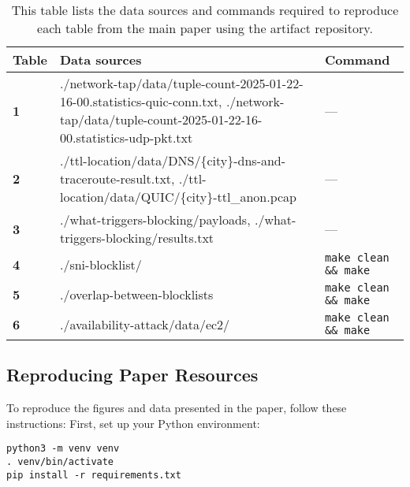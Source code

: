 \begin{table*}[h!]
    \centering
    \small
    \begin{tabularx}{\linewidth}{|l|X|X|} 
    \hline
    \textbf{Table} & \textbf{Data sources} & \textbf{Command} \\
    \hline
    \textbf{1} & ./network-tap/data/tuple-count-2025-01-22-16-00.statistics-quic-conn.txt, ./network-tap/data/tuple-count-2025-01-22-16-00.statistics-udp-pkt.txt & — \\
    \hline
    \textbf{2} & ./ttl-location/data/DNS/\{city\}-dns-and-traceroute-result.txt, ./ttl-location/data/QUIC/\{city\}-ttl\_anon.pcap & — \\
    \hline
    \textbf{3} & ./what-triggers-blocking/payloads, ./what-triggers-blocking/results.txt & — \\
    \hline
    \textbf{4} & ./sni-blocklist/ & \verb|make clean && make| \\
    \hline
    \textbf{5} & ./overlap-between-blocklists & \verb|make clean && make| \\
    \hline
    \textbf{6} & ./availability-attack/data/ec2/ & \verb|make clean && make| \\

    \hline
    \end{tabularx}
    \label{tab:t2}

    \caption{This table lists the data sources and commands required to reproduce each table from the main paper using the artifact repository.}
\end{table*}


\subsection{Reproducing Paper Resources}
\label{sec:reuse}


To reproduce the figures and data presented in the paper, follow these instructions:
First, set up your Python environment:
\begin{verbatim}
python3 -m venv venv
. venv/bin/activate
pip install -r requirements.txt
\end{verbatim}


